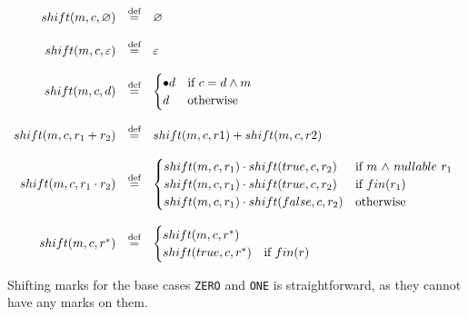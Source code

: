\documentclass[12pt]{article}
\begin{document}
  \[
\begin{array}{rcl}
  shift(m,c,\varnothing)              & \stackrel{\text{def}}{=} & \varnothing \\\\
  shift(m,c,\varepsilon)              & \stackrel{\text{def}}{=} & \varepsilon \\\\
  shift(m,c,d)              & \stackrel{\text{def}}{=} &
   \begin{cases}
    \bullet d & \text{if  \( c=d \land m \)}\\
    d         & \text{otherwise}\\
   \end{cases} \\\\

  shift(m,c, r_1 + r_2)     & \stackrel{\text{def}}{=} & shift(m,c,r1) + shift(m,c,r2) \\\\
  shift(m,c, r_1 \cdot r_2) & \stackrel{\text{def}}{=} &
    \begin{cases}
      shift(m,c,r_1) \cdot shift(true,c,r_2)  & \text{if $m$ $\land$ $nullable$  $r_1$ } \\
      shift(m,c,r_1) \cdot shift(true,c,r_2)  & \text{if $fin(r_1)$} \\
      shift(m,c,r_1) \cdot shift(false,c,r_2) & \text{otherwise}
    \end{cases} \\\\
  shift(m,c, r^*)           & \stackrel{\text{def}}{=} &
    \begin{cases}
      shift(m,c,r^*)    &  \\
      shift(true,c,r^*) & \text{if $fin(r)$} \\
    \end{cases}
\end{array}
\]

\noindent
Shifting marks for the base cases \texttt{ZERO} and \texttt{ONE} is straightforward, as they cannot have any marks on them.
\end{document}
